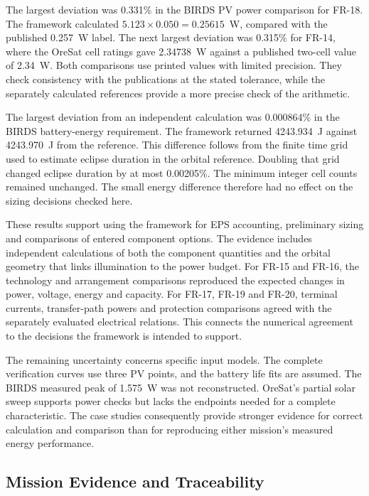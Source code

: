 The largest deviation was 0.331\% in the BIRDS PV power comparison for FR-18.
The framework calculated $5.123\times0.050=0.25615$~W, compared with the published 0.257~W label.
The next largest deviation was 0.315\% for FR-14, where the OreSat cell ratings gave 2.34738~W against a published two-cell value of 2.34~W.
Both comparisons use printed values with limited precision.
They check consistency with the publications at the stated tolerance, while the separately calculated references provide a more precise check of the arithmetic.

The largest deviation from an independent calculation was 0.000864\% in the BIRDS battery-energy requirement.
The framework returned 4243.934~J against 4243.970~J from the reference.
This difference follows from the finite time grid used to estimate eclipse duration in the orbital reference.
Doubling that grid changed eclipse duration by at most 0.00205\%.
The minimum integer cell counts remained unchanged.
The small energy difference therefore had no effect on the sizing decisions checked here.

These results support using the framework for EPS accounting, preliminary sizing and comparisons of entered component options.
The evidence includes independent calculations of both the component quantities and the orbital geometry that links illumination to the power budget.
For FR-15 and FR-16, the technology and arrangement comparisons reproduced the expected changes in power, voltage, energy and capacity.
For FR-17, FR-19 and FR-20, terminal currents, transfer-path powers and protection comparisons agreed with the separately evaluated electrical relations.
This connects the numerical agreement to the decisions the framework is intended to support.

The remaining uncertainty concerns specific input models.
The complete verification curves use three PV points, and the battery life fits are assumed.
The BIRDS measured peak of 1.575~W was not reconstructed.
OreSat's partial solar sweep supports power checks but lacks the endpoints needed for a complete characteristic.
The case studies consequently provide stronger evidence for correct calculation and comparison than for reproducing either mission's measured energy performance.

\subsection{Mission Evidence and Traceability}

